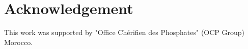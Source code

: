 \documentclass[review,3p,times,12pt]{elsarticle}
\begin{document}



\section*{Acknowledgement} This work was supported by "Office Chérifien des Phosphates" (OCP Group) Morocco.












\end{document}
